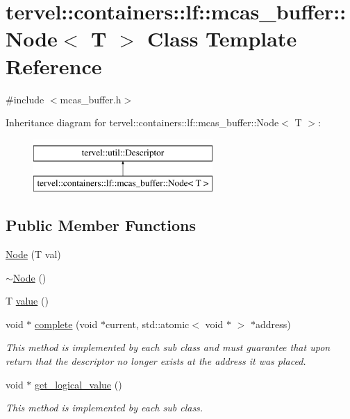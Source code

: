 \hypertarget{classtervel_1_1containers_1_1lf_1_1mcas__buffer_1_1_node}{}\section{tervel\+:\+:containers\+:\+:lf\+:\+:mcas\+\_\+buffer\+:\+:Node$<$ T $>$ Class Template Reference}
\label{classtervel_1_1containers_1_1lf_1_1mcas__buffer_1_1_node}


{\ttfamily \#include $<$mcas\+\_\+buffer.\+h$>$}

Inheritance diagram for tervel\+:\+:containers\+:\+:lf\+:\+:mcas\+\_\+buffer\+:\+:Node$<$ T $>$\+:\begin{figure}[H]
\begin{center}
\leavevmode
\includegraphics[height=2.000000cm]{classtervel_1_1containers_1_1lf_1_1mcas__buffer_1_1_node}
\end{center}
\end{figure}
\subsection*{Public Member Functions}
\begin{DoxyCompactItemize}
\item 
\hyperlink{classtervel_1_1containers_1_1lf_1_1mcas__buffer_1_1_node_ac5c94e003f42781fa851d8f83c860901}{Node} (T val)
\item 
\hyperlink{classtervel_1_1containers_1_1lf_1_1mcas__buffer_1_1_node_a424b975f90d6ba651c10b834837165e0}{$\sim$\+Node} ()
\item 
T \hyperlink{classtervel_1_1containers_1_1lf_1_1mcas__buffer_1_1_node_a64fc5cbefc0609a1e59f0d912808ecc8}{value} ()
\item 
void $\ast$ \hyperlink{classtervel_1_1containers_1_1lf_1_1mcas__buffer_1_1_node_afee54ad05721b9418bae358383e31f89}{complete} (void $\ast$current, std\+::atomic$<$ void $\ast$ $>$ $\ast$address)
\begin{DoxyCompactList}\small\item\em This method is implemented by each sub class and must guarantee that upon return that the descriptor no longer exists at the address it was placed. \end{DoxyCompactList}\item 
void $\ast$ \hyperlink{classtervel_1_1containers_1_1lf_1_1mcas__buffer_1_1_node_aceb3488510a25751e9055f13505a6a7d}{get\+\_\+logical\+\_\+value} ()
\begin{DoxyCompactList}\small\item\em This method is implemented by each sub class. \end{DoxyCompactList}\end{DoxyCompactItemize}
